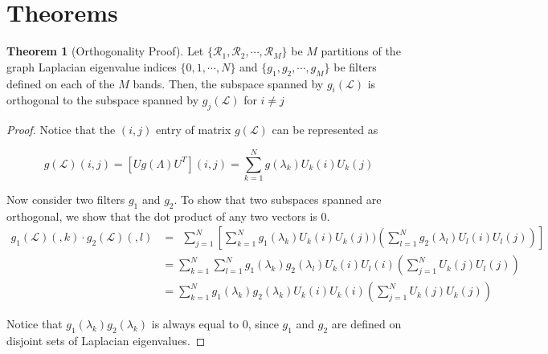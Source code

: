 \documentclass[a4paper]{article}
\newcommand{\R}{\mathcal{R}}
\newcommand{\La}{\mathcal{L}}
\theoremstyle{definition}
\newtheorem*{thm}{Theorem}
\begin{document}
\section{Theorems}
\begin{thm}[Orthogonality Proof]

Let $\{\R_1, \R_2, \cdots, \R_M\}$ be $M$ partitions of the graph Laplacian eigenvalue indices $\{0, 1, \cdots,  N \}$ and $\{g_1, g_2, \cdots, g_M \}$ be filters defined on each of the $M$ bands. Then, the subspace spanned by $g_i(\La)$ is orthogonal to the subspace spanned by $g_j(\La)$ for $i \neq j$

\end{thm}

\begin{proof}


Notice that the $(i,j)$ entry of matrix $g(\La)$ can be represented as 

$$g(\La) (i,j) = [Ug(\Lambda)U^T] (i,j) = \sum_{k = 1}^{N} g(\lambda_k) U_k(i) U_k(j)$$

Now consider two filters $g_1$ and $g_2$. To show that two subspaces spanned are orthogonal, we show that the dot product of any two vectors is 0.
\begin{align*}
g_1(\La)(,k) \cdot g_2(\La)(,l)&=\ \  \sum_{j = 1}^{N} [\sum_{k = 1}^{N} g_1(\lambda_k) U_k(i) U_k(j) )( \sum_{l = 1}^{N} g_2(\lambda_l) U_l(i) U_l(j)) ] \\
& = \sum_{k = 1}^{N} \sum_{l = 1}^{N} g_1(\lambda_k) g_2(\lambda_l)  U_k(i) U_l(i) ( \sum_{j = 1}^{N}  U_k(j)  U_l(j))  \\
& = \sum_{k = 1}^{N} g_1(\lambda_k) g_2(\lambda_k)  U_k(i) U_k(i) ( \sum_{j = 1}^{N}  U_k(j)  U_k(j)) 
\end{align*}

Notice that $g_1(\lambda_k) g_2(\lambda_k)$ is always equal to $0$, since $g_1$ and $g_2$ are defined on disjoint sets of Laplacian eigenvalues.   

\end{proof}






\end{document}
